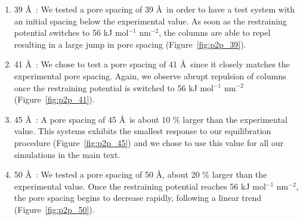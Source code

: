 \documentclass{article}
\begin{document}
	\begin{enumerate}

	\item 39 \AA~: We tested a pore spacing of 39 \AA~in order to
	have a test system with an initial spacing below the experimental value. As soon
	as the restraining potential switches to 56 kJ mol$^{-1}$ nm$^{-2}$, the
	columns are able to repel resulting in a large jump in pore spacing
	(Figure~\ref{fig:p2p_39}). %

		\item 41 \AA~: We chose to test a pore spacing of 41 \AA~since
	it closely matches the experimental pore spacing. Again, we observe abrupt
	repulsion of columns once the restraining potential is switched to 56 kJ
	mol$^{-1}$ nm$^{-2}$ (Figure~\ref{fig:p2p_41}). %

		\item 45 \AA~: A pore spacing of 45 \AA~is about 10 \% larger
	than the experimental value. This systems exhibits the smallest response to our 
 		equilibration procedure (Figure~\ref{fig:p2p_45}) and we chose to use this
        value for all our simulations in the main text.

	\item 50 \AA~: We tested a pore spacing of 50 \AA, about 20 \%
	larger than the experimental value. Once the restraining potential reaches 56
	kJ mol$^{-1}$ nm$^{-2}$, the pore spacing begins to decrease rapidly, following
	a linear trend (Figure~\ref{fig:p2p_50}).
                

\end{enumerate}
\end{document}
